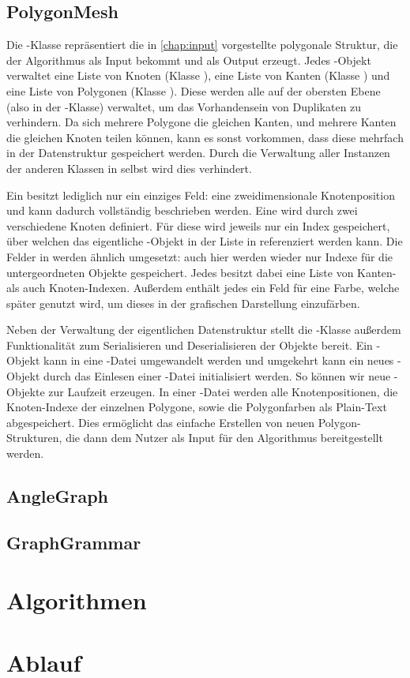 \subsection{PolygonMesh}
Die -Klasse repräsentiert die in \autoref{chap:input} vorgestellte polygonale Struktur, die der Algorithmus
als Input bekommt und als Output erzeugt. Jedes -Objekt verwaltet eine Liste von Knoten (Klasse ),
eine Liste von Kanten (Klasse ) und eine Liste von Polygonen (Klasse ). Diese werden alle auf der
obersten Ebene (also in der -Klasse) verwaltet, um das Vorhandensein von Duplikaten zu verhindern. Da sich
mehrere Polygone die gleichen Kanten, und mehrere Kanten die gleichen Knoten teilen können, kann es sonst vorkommen, dass diese mehrfach
in der Datenstruktur gespeichert werden. Durch die Verwaltung aller Instanzen der anderen Klassen in  selbst wird
dies verhindert.

Ein  besitzt lediglich nur ein einziges Feld: eine zweidimensionale Knotenposition und kann dadurch vollständig
beschrieben werden. Eine  wird durch zwei verschiedene Knoten definiert. Für diese wird jeweils nur ein Index gespeichert,
über welchen das eigentliche -Objekt in der Liste in  referenziert werden kann. Die Felder in
 werden ähnlich umgesetzt: auch hier werden wieder nur Indexe für die untergeordneten Objekte gespeichert. Jedes
 besitzt dabei eine Liste von Kanten- als auch Knoten-Indexen. Außerdem enthält jedes  ein Feld
für eine Farbe, welche später genutzt wird, um dieses in der grafischen Darstellung einzufärben.

Neben der Verwaltung der eigentlichen Datenstruktur stellt die -Klasse außerdem Funktionalität zum Serialisieren
und Deserialisieren der Objekte bereit. Ein -Objekt kann in eine -Datei umgewandelt werden und umgekehrt
kann ein neues -Objekt durch das Einlesen einer -Datei initialisiert werden. So können wir neue
-Objekte zur Laufzeit erzeugen. In einer -Datei werden alle Knotenpositionen, die Knoten-Indexe der einzelnen
Polygone, sowie die Polygonfarben als Plain-Text abgespeichert. Dies ermöglicht das einfache Erstellen von neuen Polygon-Strukturen, die
dann dem Nutzer als Input für den Algorithmus bereitgestellt werden.

\subsection{AngleGraph}

\subsection{GraphGrammar}

\section{Algorithmen}

\section{Ablauf}
